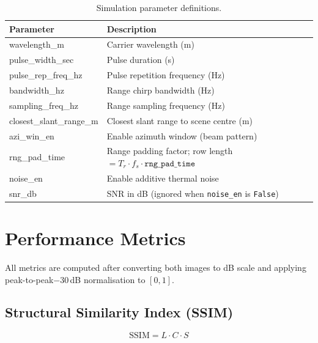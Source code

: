 \documentclass[12pt]{article}
\begin{document}
\begin{table}[H]
    \centering
    \caption{Simulation parameter definitions.}
    \begin{tabular}{>{\ttfamily}lp{}}
        \toprule
        \normalfont Parameter & Description \\
        \midrule
        wavelength\_m           & Carrier wavelength (m) \\
        pulse\_width\_sec        & Pulse duration (s) \\
        pulse\_rep\_freq\_hz     & Pulse repetition frequency (Hz) \\
        bandwidth\_hz           & Range chirp bandwidth (Hz) \\
        sampling\_freq\_hz      & Range sampling frequency (Hz) \\
        closest\_slant\_range\_m & Closest slant range to scene centre (m) \\
        azi\_win\_en            & Enable azimuth window (beam pattern) \\
        rng\_pad\_time          & Range padding factor; row length $= T_r \cdot f_s \cdot \mathtt{rng\_pad\_time}$ \\
        noise\_en               & Enable additive thermal noise \\
        snr\_db                 & SNR in dB (ignored when \texttt{noise\_en} is \texttt{False}) \\
        \bottomrule
    \end{tabular}
\end{table}

\section{Performance Metrics}

All metrics are computed after converting both images to dB scale and applying
peak-to-peak$-30$\,dB normalisation to $[0,1]$.

\subsection{Structural Similarity Index (SSIM)}

\begin{equation}
    \text{SSIM} = L \cdot C \cdot S
\end{equation}
\end{document}

